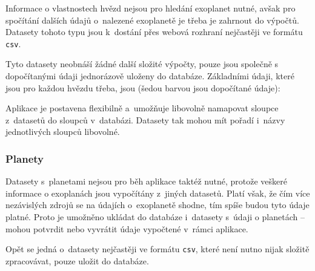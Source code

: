 \documentclass[a4paper,12pt]{article}
\def\code#1{\texttt{#1}}
\begin{document}
{{{{{{Informace o vlastnostech hvězd nejsou pro hledání exoplanet nutné, avšak pro spočítání dalších údajů o~nalezené exoplanetě je třeba je zahrnout do výpočtů. Datasety tohoto typu jsou k~dostání přes webová rozhraní nejčastěji ve formátu \code{csv}.


Tyto datasety neobnáší žádné další složité výpočty, pouze jsou společně s dopočítanými údaji jednorázově uloženy do databáze. Základními údaji, které jsou pro každou hvězdu třeba, jsou (šedou barvou jsou dopočítané údaje):


Aplikace je postavena flexibilně a~umožňuje libovolně namapovat sloupce z~datasetů do sloupců v~databázi. Datasety tak mohou mít pořadí i~názvy jednotlivých sloupců libovolné.


\subsubsection{Planety}

Datasety s~planetami nejsou pro běh aplikace taktéž nutné, protože veškeré informace o exoplanách jsou vypočítány z~jiných datasetů. Platí však, že čím více nezávislých zdrojů se na údajích o~exoplanetě shodne, tím spíše budou tyto údaje platné. Proto je umožněno ukládat do databáze i~datasety s~údaji o planetách -- mohou potvrdit nebo vyvrátit údaje vypočtené v~rámci aplikace.


Opět se jedná o~datasety nejčastěji ve formátu \code{csv}, které není nutno nijak složitě zpracovávat, pouze uložit do databáze.

}}}}}}
\end{document}
